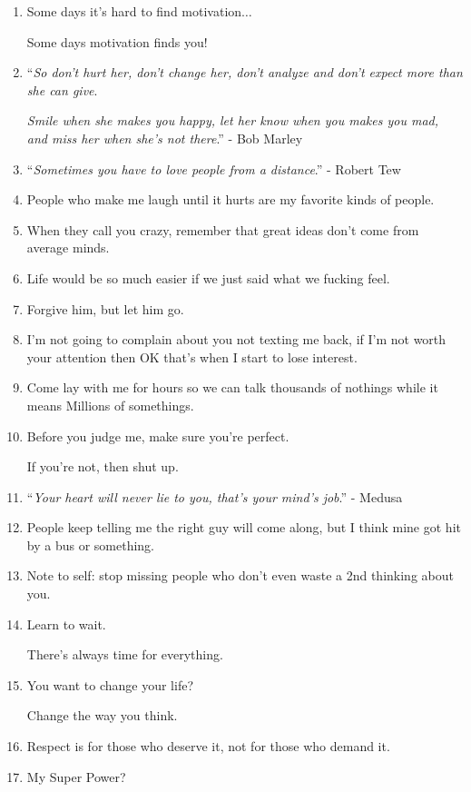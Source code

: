 \documentclass{article}
\numberwithin{equation}{section}
\begin{document}
\begin{enumerate}
    \textit{You're not falling behind, it's just not your time}$\ldots$'' - Julissa Loaiza
    \item Some days it's hard to find motivation$\ldots$
    
    Some days motivation finds you!
    \item ``\textit{So don't hurt her, don't change her, don't analyze and don't expect more than she can give}.
    
    \textit{Smile when she makes you happy, let her know when you makes you mad, and miss her when she's not there}.'' - Bob Marley
    \item ``\textit{Sometimes you have to love people from a distance}.'' - Robert Tew
    \item People who make me laugh until it hurts are my favorite kinds of people.
    \item When they call you crazy, remember that great ideas don't come from average minds.
    \item Life would be so much easier if we just said what we fucking feel.
    \item Forgive him, but let him go.
    \item I'm not going to complain about you not texting me back, if I'm not worth your attention then OK that's when I start to lose interest.
    \item Come lay with me for hours so we can talk thousands of nothings while it means Millions of somethings.
    \item Before you judge me, make sure you're perfect.
    
    If you're not, then shut up.
    \item ``\textit{Your heart will never lie to you, that's your mind's job}.'' - Medusa
    \item People keep telling me the right guy will come along, but I think mine got hit by a bus or something.
    \item Note to self: stop missing people who don't even waste a 2nd thinking about you.
    \item Learn to wait.
    
    There's always time for everything.
    \item You want to change your life?
    
    Change the way you think.
    \item Respect is for those who deserve it, not for those who demand it.
    \item My Super Power?
    

\end{enumerate}
\end{document}

